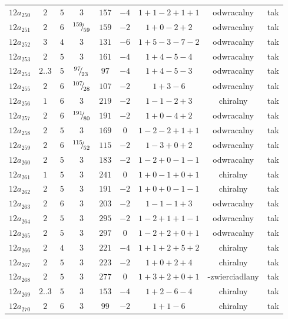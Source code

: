 \begin{longtable}{ccccccccc}
$12a_{250}$ & $2$ & $5$ & $3$ & $157$ & $-4$ & $1+1-2+1+1$ & odwracalny & tak \\
$12a_{251}$ & $2$ & $6$ & ${}^{159}{\mskip -5mu/\mskip -3mu}_{59}$ & $159$ & $-2$ & $1+0-2+2$ & odwracalny & tak \\
$12a_{252}$ & $3$ & $4$ & $3$ & $131$ & $-6$ & $1+5-3-7-2$ & odwracalny & tak \\
$12a_{253}$ & $2$ & $5$ & $3$ & $161$ & $-4$ & $1+4-5-4$ & odwracalny & tak \\
$12a_{254}$ & $2..3$ & $5$ & ${}^{97}{\mskip -5mu/\mskip -3mu}_{23}$ & $97$ & $-4$ & $1+4-5-3$ & odwracalny & tak \\
$12a_{255}$ & $2$ & $6$ & ${}^{107}{\mskip -5mu/\mskip -3mu}_{28}$ & $107$ & $-2$ & $1+3-6$ & odwracalny & tak \\
$12a_{256}$ & $1$ & $6$ & $3$ & $219$ & $-2$ & $1-1-2+3$ & chiralny & tak \\
$12a_{257}$ & $2$ & $6$ & ${}^{191}{\mskip -5mu/\mskip -3mu}_{80}$ & $191$ & $-2$ & $1+0-4+2$ & odwracalny & tak \\
$12a_{258}$ & $2$ & $5$ & $3$ & $169$ & $0$ & $1-2-2+1+1$ & odwracalny & tak \\
$12a_{259}$ & $2$ & $6$ & ${}^{115}{\mskip -5mu/\mskip -3mu}_{52}$ & $115$ & $-2$ & $1-3+0+2$ & odwracalny & tak \\
$12a_{260}$ & $2$ & $5$ & $3$ & $183$ & $-2$ & $1-2+0-1-1$ & odwracalny & tak \\
$12a_{261}$ & $1$ & $5$ & $3$ & $241$ & $0$ & $1+0-1+0+1$ & chiralny & tak \\
$12a_{262}$ & $2$ & $5$ & $3$ & $191$ & $-2$ & $1+0+0-1-1$ & chiralny & tak \\
$12a_{263}$ & $2$ & $6$ & $3$ & $203$ & $-2$ & $1-1-1+3$ & odwracalny & tak \\
$12a_{264}$ & $2$ & $5$ & $3$ & $295$ & $-2$ & $1-2+1+1-1$ & odwracalny & tak \\
$12a_{265}$ & $2$ & $5$ & $3$ & $297$ & $0$ & $1-2+2+0+1$ & odwracalny & tak \\
$12a_{266}$ & $2$ & $4$ & $3$ & $221$ & $-4$ & $1+1+2+5+2$ & chiralny & tak \\
$12a_{267}$ & $2$ & $5$ & $3$ & $223$ & $-2$ & $1+0+2+4$ & chiralny & tak \\
$12a_{268}$ & $2$ & $5$ & $3$ & $277$ & $0$ & $1+3+2+0+1$ & -zwierciadlany & tak \\
$12a_{269}$ & $2..3$ & $5$ & $3$ & $153$ & $-4$ & $1+2-6-4$ & chiralny & tak \\
$12a_{270}$ & $2$ & $6$ & $3$ & $99$ & $-2$ & $1+1-6$ & chiralny & tak \\

\end{longtable}
